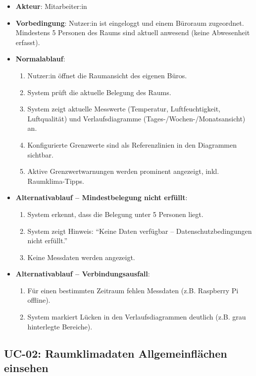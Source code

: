 \documentclass[12pt,a4paper]{article}
\begin{document}
\begin{itemize}
  \item \textbf{Akteur}: Mitarbeiter:in
  \item \textbf{Vorbedingung}: Nutzer:in ist eingeloggt und einem Büroraum zugeordnet. Mindestens 5 Personen des Raums sind aktuell anwesend (keine Abwesenheit erfasst).
  \item \textbf{Normalablauf}:
    \begin{enumerate}
      \item Nutzer:in öffnet die Raumansicht des eigenen Büros.
      \item System prüft die aktuelle Belegung des Raums.
      \item System zeigt aktuelle Messwerte (Temperatur, Luftfeuchtigkeit, Luftqualität) und Verlaufsdiagramme (Tages-/Wochen-/Monatsansicht) an.
      \item Konfigurierte Grenzwerte sind als Referenzlinien in den Diagrammen sichtbar.
      \item Aktive Grenzwertwarnungen werden prominent angezeigt, inkl. Raumklima-Tipps.
    \end{enumerate}
  \item \textbf{Alternativablauf -- Mindestbelegung nicht erfüllt}:
    \begin{enumerate}
      \item System erkennt, dass die Belegung unter 5 Personen liegt.
      \item System zeigt Hinweis: ``Keine Daten verfügbar -- Datenschutzbedingungen nicht erfüllt.''
      \item Keine Messdaten werden angezeigt.
    \end{enumerate}
  \item \textbf{Alternativablauf -- Verbindungsausfall}:
    \begin{enumerate}
      \item Für einen bestimmten Zeitraum fehlen Messdaten (z.B. Raspberry Pi offline).
      \item System markiert Lücken in den Verlaufsdiagrammen deutlich (z.B. grau hinterlegte Bereiche).
    \end{enumerate}
\end{itemize}

\subsection{UC-02: Raumklimadaten Allgemeinflächen einsehen}
\end{document}
